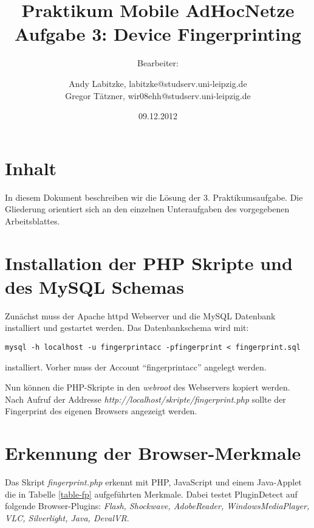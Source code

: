 \documentclass[12pt,a4paper,titlepage]{article}
\begin{document}
\title{Praktikum Mobile AdHocNetze\\
	Aufgabe 3: Device Fingerprinting}
\author{
Bearbeiter: \and
	Andy Labitzke, labitzke@studserv.uni-leipzig.de \\ 
	Gregor Tätzner, wir08ehh@studserv.uni-leipzig.de}
\date{09.12.2012}
\maketitle
\setcounter{page}{1}
\appendix

\section*{Inhalt}
In diesem Dokument beschreiben wir die Lösung der 3. Praktikumsaufgabe. Die Gliederung orientiert sich an den einzelnen Unteraufgaben des vorgegebenen Arbeitsblattes.

\setcounter{section}{0}

\section{Installation der PHP Skripte und des MySQL Schemas}

Zunächst muss der Apache httpd Webserver und die MySQL Datenbank installiert und gestartet werden. Das Datenbankschema wird mit:
\begin{lstlisting}
mysql -h localhost -u fingerprintacc -pfingerprint < fingerprint.sql
\end{lstlisting}
installiert. Vorher muss der Account "`fingerprintacc"' angelegt werden.

Nun können die PHP-Skripte in den \textit{webroot} des Webservers kopiert werden. Nach Aufruf der Addresse \textit{http://localhost/skripte/fingerprint.php} sollte der Fingerprint des eigenen Browsers angezeigt werden.

\section{Erkennung der Browser-Merkmale}

Das Skript \textit{fingerprint.php} erkennt mit PHP, JavaScript und einem Java-Applet die in Tabelle \ref{table-fp} aufgeführten Merkmale. Dabei testet PluginDetect auf folgende Browser-Plugins: \textit{Flash, Shockwave, AdobeReader, WindowsMediaPlayer, VLC, Silverlight, Java, DevalVR}.
\end{document}
